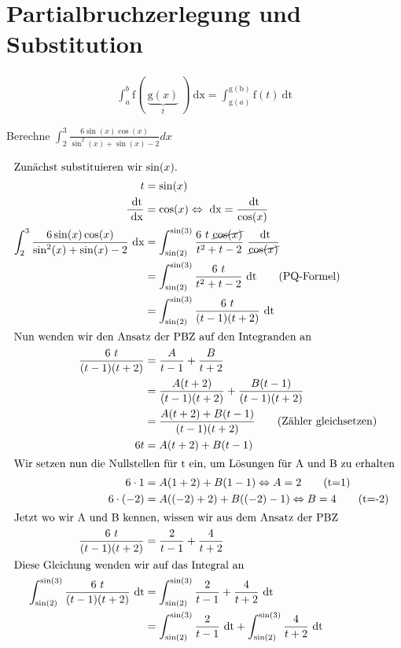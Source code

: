 \documentclass[11pt, a4paper]{article}
\providecommand{\dx}{\ \mathrm{dx}}
\providecommand{\dt}{\ \mathrm{dt}}
\begin{document}
\newpage
\section{Partialbruchzerlegung und Substitution} %
\begin{align}
	\int_a^b \mathrm{f}( \ \underbrace{\mathrm{g}(x)}_t \ ) \dx = \int_{\mathrm{g}(a)} ^{\mathrm{g(b)}} \mathrm{f}(t) \dt
	\label{eq:substitution}
\end{align}

Berechne $\displaystyle \int_2^3 \frac{6 \sin(x) \cos(x)}{\sin^2(x) + \sin(x) - 2 } dx$

\begin{align*}
	\intertext{Zunächst substituieren wir $\sin(x)$.}
	t &= \sin(x) \\
	\frac{\dt}{\dx} &= \cos(x) \Leftrightarrow \dx = \frac{\dt}{\cos(x)} \\
	\int_2^3 \frac{6 \sin(x) \cos(x)}{\sin^2(x) + \sin(x) - 2 } \dx &= \int_{\sin(2)}^{\sin(3)} \frac{6 \ t \ \cancel{\cos(x)}}{t^2 + t - 2} \ \frac{\dt}{\cancel{\cos(x)}} \\
	&= \int_{\sin(2)}^{\sin(3)} \frac{6 \ t}{t^2 + t - 2} \dt \tag{PQ-Formel} \\
	&= \int_{\sin(2)}^{\sin(3)} \frac{6 \ t}{(t-1)(t+2)} \dt \\
	\intertext{Nun wenden wir den Ansatz der PBZ auf den Integranden an}
	\frac{6 \ t}{(t-1)(t+2)} &= \frac{A}{t-1} + \frac{B}{t+2} \\
	&= \frac{A (t+2)}{(t-1)(t+2)} + \frac{B (t-1)}{(t-1)(t+2)} \\
	&= \frac{A (t+2) + B (t-1)}{(t-1)(t+2)} \tag{Zähler gleichsetzen} \\
	6t &= A (t+2) + B (t-1) \\
	\intertext{Wir setzen nun die Nullstellen für t ein, um Lösungen für A und B zu erhalten}
	6 \cdot 1 &= A (1+2) + B (1-1) \Leftrightarrow A = 2 \tag{t=1} \\
	6 \cdot (-2) &= A ((-2)+2) + B ((-2)-1) \Leftrightarrow B = 4 \tag{t=-2} \\
	\intertext{Jetzt wo wir A und B kennen, wissen wir aus dem Ansatz der PBZ}
	\frac{6 \ t}{(t-1)(t+2)} &= \frac{2}{t-1} + \frac{4}{t+2} \\
	\intertext{Diese Gleichung wenden wir auf das Integral an}
	 \int_{\sin(2)}^{\sin(3)} \frac{6 \ t}{(t-1)(t+2)} \dt &=  \int_{\sin(2)}^{\sin(3)} \frac{2}{t-1} + \frac{4}{t+2} \dt \\
	 &= \int_{\sin(2)}^{\sin(3)} \frac{2}{t-1} \dt + \int_{\sin(2)}^{\sin(3)} \frac{4}{t+2} \dt \\

\end{align*}
\end{document}
